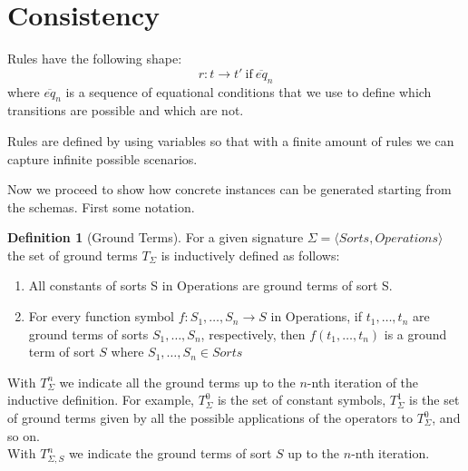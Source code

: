 \documentclass{article}[12pt,a4paper]
\theoremstyle{definition}
\newtheorem{definition}{Definition}
\begin{document}
\section{Consistency}



Rules have the following shape:
\[r: t\rightarrow t'~\text{if}~\overline{eq}_n\]
where $\overline{eq}_n$ is a sequence of equational conditions that we use to
define which transitions are possible and which are not.

Rules are defined by using variables so that with a finite amount of rules we
can capture infinite possible scenarios.

Now we proceed to show how concrete instances can be generated starting from the
schemas. First some notation.

\begin{definition}[Ground Terms]
  For a given signature $\Sigma=\langle Sorts, Operations \rangle$ the set of ground
  terms $T_\Sigma$ is inductively defined as follows:
  \begin{enumerate}
  \item All constants of sorts S in Operations are ground terms of sort S.
  \item For every function symbol $f:S_1,\ldots,S_n\rightarrow S$ in Operations,
    if $t_1,\ldots,t_n$ are ground terms of sorts $S_1,\ldots,S_n$,
    respectively, then $f(t_1,\ldots,t_n)$ is a ground term of sort $S$ where
    $S_1,\ldots,S_n\in Sorts$
  \end{enumerate}

  With $T_\Sigma^n$ we indicate all the ground terms up to the $n$-nth iteration
  of the inductive definition. For example, $T_\Sigma^0$ is the set of constant
  symbols, $T_\Sigma^1$ is the set of ground terms given by all the possible
  applications of the operators to $T_\Sigma^0$, and so on.\\
  With $T_{\Sigma, S}^n$ we indicate the ground terms of sort $S$ up to the
  $n$-nth iteration.
\end{definition}
\end{document}
